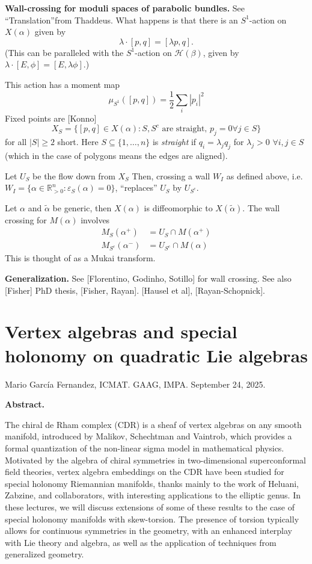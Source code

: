 {\medskip\noindent
{\bf Wall-crossing for moduli spaces of parabolic bundles.}
See ``Translation''from Thaddeus.
What happens is that there is an $S^1$-action on $X(\alpha)$ given by
$$
\lambda\cdot[p,q]=[\lambda p,q].
$$
(This can be paralleled with the $S^1$-action on $\mathcal{H}(\beta)$,
given by $\lambda\cdot[E,\phi]=[E,\lambda\phi]$.)

This action has a moment map
$$
\mu_{S^1}([p,q])=\frac{1}{2}\sum_{i}|p_i|^2
$$
Fixed points are [Konno]
$$
X_S=\{[p,q] \in X(\alpha):
S,S^c \text{ are straight, }p_j=0 \forall j \in S\}
$$
for all $|S|\geq 2$ short. Here $S\subseteq \{1,\ldots,n\}$ 
is {\it straight} if $q_i=\lambda_j q_j$
for $\lambda_j>0$ $\forall  i,j \in S$ 
(which in the case of polygons means the edges are aligned).

Let $U_S$ be the flow down from $X_S$
Then, crossing a wall  $W_I$ as defined above,
i.e. $W_I=\{\alpha \in \mathbb{R}^n_{>0}:\varepsilon_S(\alpha)=0\}$,
``replaces'' $U_S$ by $U_{S^c}$.

Let $\alpha$ and $\tilde{\alpha}$ be generic,
then $X(\alpha)$ is diffeomorphic to $X(\tilde{\alpha})$.
The wall crossing for $M(\alpha)$
involves
\begin{align*}
M_S(\alpha^+)&=U_S \cap M(\alpha^+)\\
M_{S^c}(\alpha^-)&=U_{S^c}\cap M(\alpha)
\end{align*}
This is thought of as a Mukai transform.

\medskip\noindent
{\bf Generalization.}
See [Florentino, Godinho, Sotillo] for wall crossing.
See also [Fisher] PhD thesis, [Fisher, Rayan].
[Hausel et al], [Rayan-Schopnick].

\section{Vertex algebras and special holonomy on quadratic Lie algebras}
\label{section-vertex-algebras-and-special-holonomy-on-quadratic-Lie-algebras}

\noindent
Mario García Fernandez, ICMAT.
GAAG, IMPA. 
September 24, 2025.

\medskip
{\bf Abstract.} 

The chiral de Rham complex (CDR) is a sheaf of vertex algebras on any smooth
manifold, introduced by Malikov, Schechtman and Vaintrob, which provides a
formal quantization of the non-linear sigma model in mathematical physics.
Motivated by the algebra of chiral symmetries in two-dimensional superconformal
field theories, vertex algebra embeddings on the CDR have been studied for
special holonomy Riemannian manifolds, thanks mainly to the work of Heluani,
Zabzine, and collaborators, with interesting applications to the elliptic genus.
In these lectures, we will discuss extensions of some of these results to the
case of special holonomy manifolds with skew-torsion. The presence of torsion
typically allows for continuous symmetries in the geometry, with an enhanced
interplay with Lie theory and algebra, as well as the application of techniques
from generalized geometry.


}
